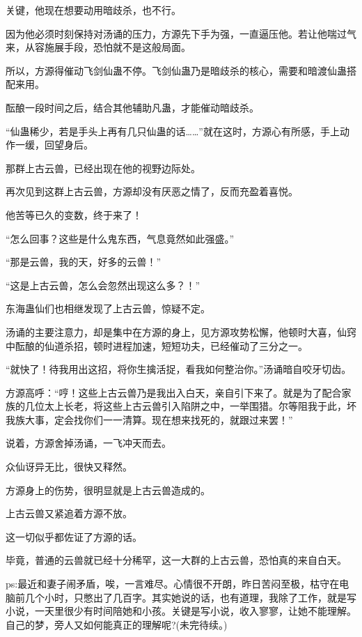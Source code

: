 \begin{this_body}
关键，他现在想要动用暗歧杀，也不行。

因为他必须时刻保持对汤诵的压力，方源先下手为强，一直逼压他。若让他喘过气来，从容施展手段，恐怕就不是这般局面。

所以，方源得催动飞剑仙蛊不停。飞剑仙蛊乃是暗歧杀的核心，需要和暗渡仙蛊搭配来用。

酝酿一段时间之后，结合其他辅助凡蛊，才能催动暗歧杀。

“仙蛊稀少，若是手头上再有几只仙蛊的话……”就在这时，方源心有所感，手上动作一缓，回望身后。

那群上古云兽，已经出现在他的视野边际处。

再次见到这群上古云兽，方源却没有厌恶之情了，反而充盈着喜悦。

他苦等已久的变数，终于来了！

“怎么回事？这些是什么鬼东西，气息竟然如此强盛。”

“那是云兽，我的天，好多的云兽！”

“这是上古云兽，怎么会忽然出现这么多？！”

东海蛊仙们也相继发现了上古云兽，惊疑不定。

汤诵的主要注意力，却是集中在方源的身上，见方源攻势松懈，他顿时大喜，仙窍中酝酿的仙道杀招，顿时进程加速，短短功夫，已经催动了三分之一。

“就快了！待我用出这招，将你生擒活捉，看我如何整治你。”汤诵暗自咬牙切齿。

方源高呼：“哼！这些上古云兽乃是我出入白天，亲自引下来了。就是为了配合家族的几位太上长老，将这些上古云兽引入陷阱之中，一举围猎。尔等阻我于此，坏我族大事，定会找你们一一清算。现在想来找死的，就跟过来罢！”

说着，方源舍掉汤诵，一飞冲天而去。

众仙讶异无比，很快又释然。

方源身上的伤势，很明显就是上古云兽造成的。

上古云兽又紧追着方源不放。

这一切似乎都佐证了方源的话。

毕竟，普通的云兽就已经十分稀罕，这一大群的上古云兽，恐怕真的来自白天。

ps:最近和妻子闹矛盾，唉，一言难尽。心情很不开朗，昨日苦闷至极，枯守在电脑前几个小时，只憋出了几百字。其实她说的话，也有道理，我除了工作，就是写小说，一天里很少有时间陪她和小孩。关键是写小说，收入寥寥，让她不能理解。自己的梦，旁人又如何能真正的理解呢?(未完待续。)

\end{this_body}

